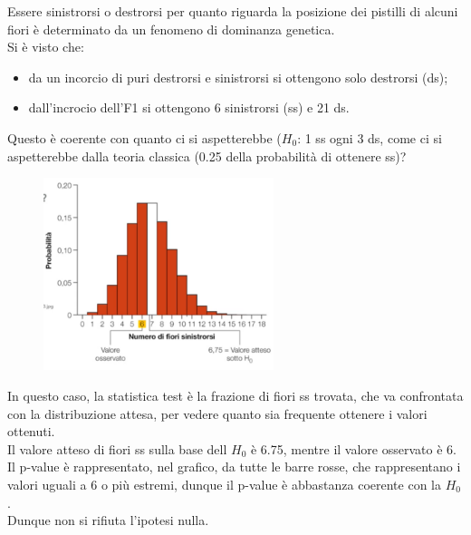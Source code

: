 \documentclass[10pt, draft]{book}
\newcounter{example}[section]
\begin{document}
\begin{example}
    Essere sinistrorsi o destrorsi per quanto riguarda la posizione dei pistilli di alcuni fiori è determinato da un fenomeno di dominanza genetica.
    \\
    Si è visto che:
    \begin{itemize}
        \item da un incorcio di puri destrorsi e sinistrorsi si ottengono solo destrorsi (ds);
        \item dall’incrocio dell’F1 si ottengono 6 sinistrorsi (ss) e 21 ds.
    \end{itemize}
    Questo è coerente con quanto ci si aspetterebbe ($H_0$: 1 ss ogni 3 ds, come ci si aspetterebbe dalla teoria classica (0.25 della probabilità di ottenere ss)?
    \begin{figure}[H]\label{fig6.4-1}
    \centering
    \includegraphics[width=0.6\textwidth]{fig6.4-1}
    \caption{\small{}}
    \end{figure}
In questo caso, la statistica test è la frazione di fiori ss trovata, che va confrontata con la distribuzione attesa, per vedere quanto sia frequente ottenere i valori ottenuti.
\\
Il valore atteso di fiori ss sulla base dell $H_0$ è 6.75, mentre il valore osservato è 6.
\\
Il p-value è rappresentato, nel grafico, da tutte le barre rosse, che rappresentano i valori uguali a 6 o più estremi, dunque il p-value è abbastanza coerente con la $H_0$.
\\
Dunque non si rifiuta l'ipotesi nulla.
\end{example}
\end{document}
